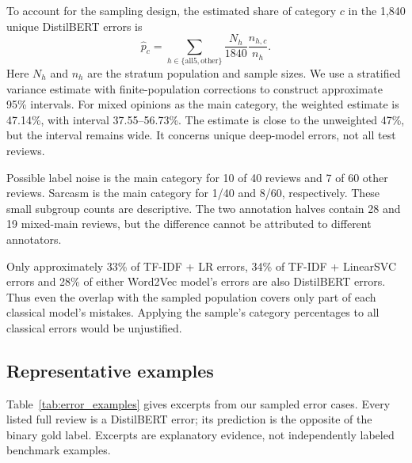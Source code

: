 To account for the sampling design, the estimated share of category $c$ in
the 1,840 unique DistilBERT errors is
\begin{equation}
 \widehat p_c=\sum_{h\in\{\mathrm{all5},\mathrm{other}\}}
 \frac{N_h}{1840}\frac{n_{h,c}}{n_h}.
\end{equation}
Here $N_h$ and $n_h$ are the stratum population and sample sizes. We use
a stratified variance estimate with finite-population corrections
to construct approximate 95\% intervals. For mixed opinions as the main
category, the weighted estimate is 47.14\%, with interval 37.55--56.73\%.
The estimate is close to the unweighted 47\%, but the interval remains wide.
It concerns unique deep-model errors, not all test reviews.

Possible label noise is the main category for 10 of 40  reviews and
7 of 60 other reviews. Sarcasm is the main category for 1/40 and 8/60,
respectively. These small subgroup counts are descriptive. The two annotation
halves contain 28 and 19 mixed-main reviews, but the difference cannot be
attributed to different annotators.

Only approximately 33\% of TF-IDF + LR errors, 34\% of TF-IDF + LinearSVC
errors and 28\% of either Word2Vec model's errors are also DistilBERT errors.
Thus even the overlap with the sampled population covers only part of each
classical model's mistakes. Applying the sample's category percentages to all
classical errors would be unjustified.

\subsection{Representative examples}
Table~\ref{tab:error_examples} gives excerpts from our sampled error cases.
Every listed full review is a DistilBERT error; its prediction is the opposite
of the binary gold label. Excerpts are explanatory evidence, not independently
labeled benchmark examples.

